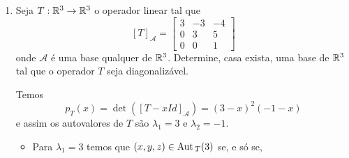 \begin{exemplo}
\begin{enumerate}
\begin{solucao}
\begin{itemize}
\[				\]
				isto \'e, $x = iy$. Logo
				\[
					\aut_T(i) = \{(iy,y) \in \complex^2 \mid y \in \complex\} = [(i,1)].
				\]
				Assim, $\mathcal{B}_1 = \{(i,1)\}$ \'e uma base de $\aut_T(i)$ e da{\'\i} $\dim_\complex\aut_T(i) = 1$.
				\item Para $\lambda_1 = -i$ temos:
				\[
					[T + iId]_\mathcal{A} = \begin{bmatrix} i & -1\\1 & i\end{bmatrix}
				\]
				e assim $(x,y) \in \aut_T(-i)$ se, e s\'o se,
				\[
					\begin{bmatrix} i & -1\\1 & i\end{bmatrix} \begin{bmatrix} x\\y\end{bmatrix}	 = \begin{bmatrix} 0\\0\end{bmatrix},
				\]
				isto \'e, $x = -iy$. Logo
				\[
					\aut_T(-i) = \{(-iy,y) \in \complex^2 \mid y \in \complex\} = [(-i,1)].
				\]
				Assim, $\mathcal{B}_2 = \{(-i,1)\}$ \'e uma base de $\aut_T(-i)$ e da{\'\i} $\dim_\complex\aut_T(-i) = 1$.
			\end{itemize}
			Agora o conjunto $\mathcal{B} = \mathcal{B}_1 \cup \mathcal{B}_2 = \{(i,1);(-i,1)\}$ \'e uma base de $\complex^2$ e nesta base temos
			\[
				[T]_\mathcal{B} = \begin{bmatrix} i & 0\\0 & -i\end{bmatrix}.
			\]
		\end{solucao}
		\item Seja $T : \mathbb{R}^3 \to \mathbb{R}^3$ o operador linear tal que
		\[
			[T]_\mathcal{A} = \begin{bmatrix}
								3 & -3 & -4\\
								0 & 3 & 5\\
								0 & 0 & 1
							\end{bmatrix}
		\]
		onde $\mathcal{A}$ \'e uma base qualquer de $\mathbb{R}^3$. Determine, casa exista, uma base de $\mathbb{R}^3$ tal que o operador $T$ seja diagonaliz\'avel.
		\begin{solucao}
			Temos
			\[
				p_T(x) = \det([T - xId]_\mathcal{A}) = (3 - x)^2(-1 -x)
			\]
			e assim os autovalores de $T$ s\~ao $\lambda_1 = 3$ e $\lambda_2 = -1$.
			\begin{itemize}
				\item Para $\lambda_1 = 3$ temos que $(x,y,z) \in {\rm Aut\,}_T(3)$ se, e s\'o se,

\end{itemize}
\end{solucao}
\end{enumerate}
\end{exemplo}

